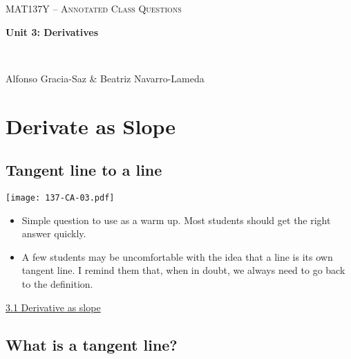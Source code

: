 \documentclass[11pt]{article}
\newcommand{\nl}{\hfill \vspace{-1.1\baselineskip}} %
\newcommand{\vi}{\hspace{8mm} \href{https://www.youtube.com/watch?v=7vhux5TLRmQ&list=PLlwePzQY_wW8qiZD6XYqCnibdY37ygbx7&index=1}{3.1 Derivative as slope}}
\begin{document}
\thispagestyle{empty}
	\begin{center}
		{ {\LARGE  \scshape
		\textcolor{137cp3}{MAT137Y --   Annotated Class Questions}
		}
		
		\medskip
		{\bf \Large \textcolor{137cp1}{Unit 3: Derivatives
		}}
		
		\
		
		\medskip
		{\large
		\textcolor{137cp1}{Alfonso Gracia-Saz \& Beatriz Navarro-Lameda}
		}}
	\end{center}

\vspace{5mm}





\tableofcontents

\newpage
\section{Derivate as Slope}

\subsection{Tangent line to a line} 

\begin{center}
{ \texttt{[image: 137-CA-03.pdf]}} 
\end{center}


\begin{comments}
\nl
\begin{itemize}
	\item Simple question to use as a warm up.  Most students should get the right answer quickly.
	\item A few students may be uncomfortable with the idea that a line is its own tangent line.  I remind them that, when in doubt, we always need to go back to the definition.
\end{itemize}	
\end{comments}

\begin{videos}
\vi
\end{videos}


\newpage
\subsection{What is a tangent line?} 
\end{document}
